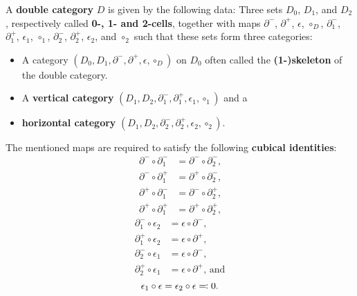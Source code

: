 \begin{defn} \label{def:dbl-cat}
A \textbf{double category} $D$ is given by the following data:
Three sets $D_0$, $D_1$, and $D_2$, respectively called \textbf{0-, 1- and
2-cells}, together with
maps $\partial^-$, $\partial^+$, $\epsilon$, $\circ_D$,
$\partial^-_1$, $\partial^+_1$, $\epsilon_1$, $\circ_1$,
$\partial^-_2$, $\partial^+_2$, $\epsilon_2$, and $\circ_2$
such that these sets form three categories:
\begin{itemize}
\item A category $(D_0, D_1, \partial^-, \partial^+, \epsilon, \circ_D)$ 
on $D_0$ often called the \textbf{(1-)skeleton} of the double category.
\item A \textbf{vertical category}
$(D_1, D_2, \partial^-_1, \partial^+_1, \epsilon_1, \circ_1)$ and a 
\item \textbf{horizontal category}
$(D_1, D_2, \partial^-_2, \partial^+_2, \epsilon_2, \circ_2)$.
\end{itemize}

The mentioned maps are required to satisfy the following \textbf{cubical
identities}:
\begin{equation} \label{eq:corner-ident}
\begin{aligned}
\partial^- \circ \partial^-_1 &= \partial^- \circ \partial^-_2\text{,} \\
\partial^- \circ \partial^+_1 &= \partial^+ \circ \partial^-_2\text{,} \\
\partial^+ \circ \partial^-_1 &= \partial^- \circ \partial^+_2\text{,} \\
\partial^+ \circ \partial^+_1 &= \partial^+ \circ \partial^+_2\text{,}
\end{aligned}
\end{equation}
\begin{equation} \label{eq:degen-ident}
\begin{aligned}
\partial^-_1 \circ \epsilon_2 &= \epsilon \circ \partial^-\text{,} \\
\partial^+_1 \circ \epsilon_2 &= \epsilon \circ \partial^+\text{,} \\
\partial^-_2 \circ \epsilon_1 &= \epsilon \circ \partial^-\text{,} \\
\partial^+_2 \circ \epsilon_1 &= \epsilon \circ \partial^+\text{, and}
\end{aligned}
\end{equation}
\begin{equation} \label{eq:zero-unique-ident}
\epsilon_1 \circ \epsilon = \epsilon_2 \circ \epsilon \eqqcolon 0\text{.}	 \\
\end{equation}


\end{defn}
